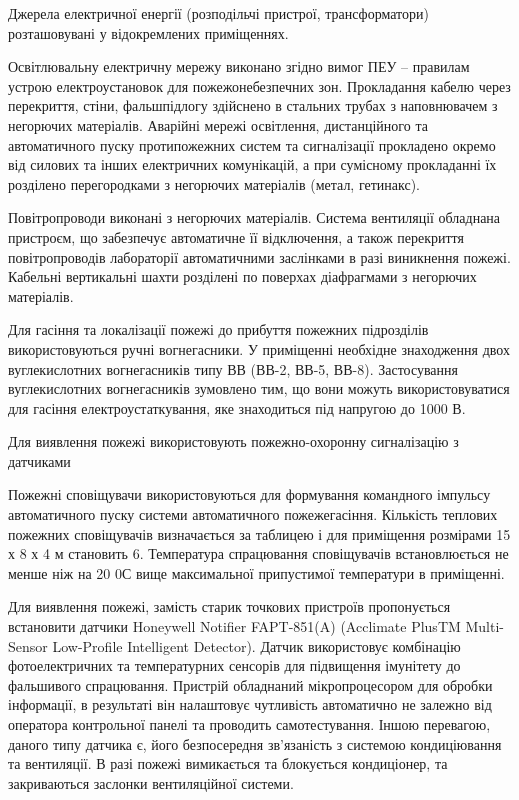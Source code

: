 Джерела електричної енергії (розподільчі пристрої, трансформатори) розташовувані у відокремлених приміщеннях.

Освітлювальну електричну мережу виконано згідно вимог ПЕУ – правилам устрою електроустановок для пожежонебезпечних зон.
Прокладання кабелю через перекриття, стіни, фальшпідлогу здійснено в стальних трубах з наповнювачем з негорючих матеріалів.
Аварійні мережі освітлення, дистанційного та автоматичного пуску протипожежних систем та сигналізації 
прокладено окремо від силових та інших електричних комунікацій, а при сумісному прокладанні їх 
розділено перегородками з негорючих матеріалів (метал, гетинакс).

Повітропроводи виконані з негорючих матеріалів. Система вентиляції обладнана пристроєм, що 
забезпечує автоматичне її відключення, а також перекриття повітропроводів лабораторії 
автоматичними заслінками в разі виникнення пожежі. Кабельні вертикальні шахти розділені 
по поверхах діафрагмами з негорючих матеріалів.

Для гасіння та локалізації пожежі до прибуття пожежних підрозділів використовуються 
ручні вогнегасники.  У приміщенні необхідне знаходження двох вуглекислотних вогнегасників 
типу ВВ (ВВ-2, ВВ-5, ВВ-8). Застосування вуглекислотних вогнегасників зумовлено тим, що 
вони можуть використовуватися для гасіння електроустаткування, яке знаходиться під напругою до 1000 В. 

Для виявлення пожежі використовують пожежно-охоронну сигналізацію з датчиками 

Пожежні сповіщувачи використовуються для формування командного імпульсу автоматичного 
пуску системи автоматичного пожежегасіння. Кількість теплових пожежних сповіщувачів 
визначається за таблицею і для приміщення розмірами 15 х 8 х 4 м становить 6. 
Температура спрацювання сповіщувачів встановлюється не менше ніж на 20 0С вище 
максимальної припустимої температури в приміщенні.

Для виявлення пожежі, замість старик точкових пристроїв пропонується
встановити датчики Honeywell Notifier FAPT-851(A)
(Acclimate PlusTM Multi-Sensor Low-Profile Intelligent Detector). Датчик 
використовує комбінацію фотоелектричних та температурних сенсорів для
підвищення імунітету до фальшивого спрацювання. Пристрій обладнаний мікропроцесором
для обробки інформації, в результаті він налаштовує чутливість автоматично
не залежно від оператора контрольної панелі та проводить самотестування.
Іншою перевагою, даного типу датчика є, його безпосередня зв'язаність з системою
кондиціювання та вентиляції. В разі пожежі вимикається та блокується кондиціонер,
та закриваються заслонки вентиляційної системи.

